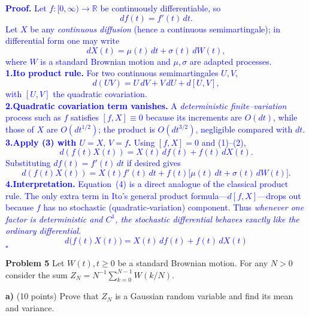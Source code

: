 \documentclass{article}
\begin{document}
    \textcolor{blue}{
\textbf{Proof.}\;%
Let $f:[0,\infty)\!\to\!\mathbb R$ be continuously differentiable, so
$$
df(t)=f'(t)\,dt.
$$
Let $X$ be any \emph{continuous diffusion} (hence a continuous semimartingale); in differential form one may write
$$
dX(t)=\mu(t)\,dt+\sigma(t)\,dW(t),
$$
where $W$ is a standard Brownian motion and $\mu,\sigma$ are adapted processes. \\
\medskip
\textbf{1.\;Ito product rule.}  
For two continuous semimartingales $U,V$,
$$
d(UV)=U\,dV+V\,dU+d[U,V],
$$
with $[U,V]$ the quadratic covariation. \\
\medskip
\textbf{2.\;Quadratic covariation term vanishes.}  
A \emph{deterministic finite–variation} process such as $f$ satisfies $[f,X]\equiv0$ because its increments are $O(dt)$, while those of $X$ are $O(dt^{1/2})$; the product is $O(dt^{3/2})$, negligible compared with $dt$.
\medskip
\textbf{3.\;Apply (3) with $U=X,\,V=f$.}  
Using $[f,X]=0$ and (1)–(2),
$$
d(f(t)X(t))=X(t)\,df(t)+f(t)\,dX(t).
$$
Substituting $df(t)=f'(t)\,dt$ if desired gives
$$
d(f(t)X(t))=X(t)f'(t)\,dt+f(t)\bigl[\mu(t)\,dt+\sigma(t)\,dW(t)\bigr].
$$
\medskip
\textbf{4.\;Interpretation.}  
Equation (4) is a direct analogue of the classical product rule.  The only extra term in Ito’s general product formula—$d[f,X]$—drops out because $f$ has no stochastic (quadratic‑variation) component.  Thus \emph{whenever one factor is deterministic and $C^{1}$, the stochastic differential behaves exactly like the ordinary differential}.
\[
\boxed{\,d\!\bigl(f(t)X(t)\bigr)=X(t)\,df(t)+f(t)\,dX(t)\,}
\]
\hfill$\square$
}



\textbf{Problem 5}   Let $W(t), t \geq 0$ be a standard Brownian motion. For any $N > 0$ consider the sum
$Z_N = N^{-1} \sum_{k=0}^{N-1} W(k/N).$

\textbf{a)}   (10 points) Prove that $Z_N$ is a Gaussian random variable and find its mean and variance.
\end{document}
